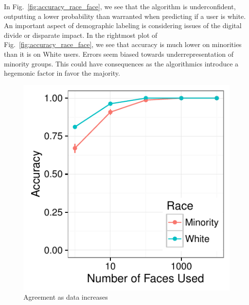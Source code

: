 In Fig.~\ref{fig:accuracy_race_face}, we see that the algorithm is underconfident, outputting a lower probability than warranted when predicting if a user is white.
An important aspect of demographic labeling is considering issues of the digital divide or disparate impact.
In the rightmost plot of Fig.~\ref{fig:accuracy_race_face}, we see that accuracy is much lower on minorities than it is on White users.
Errors seem biased towards underrepresentation of minority groups.
This could have consequences as the algorithmics introduce a hegemonic factor in favor the majority.

\begin{figure}
  \centering
  \includegraphics[width=\linewidth]{fig/census/faces_v_accuracy_race_large-eps-converted-to.pdf}
  \caption{Agreement as data increases}
  \label{fig:faces_v_accuracy_large}
\end{figure}

